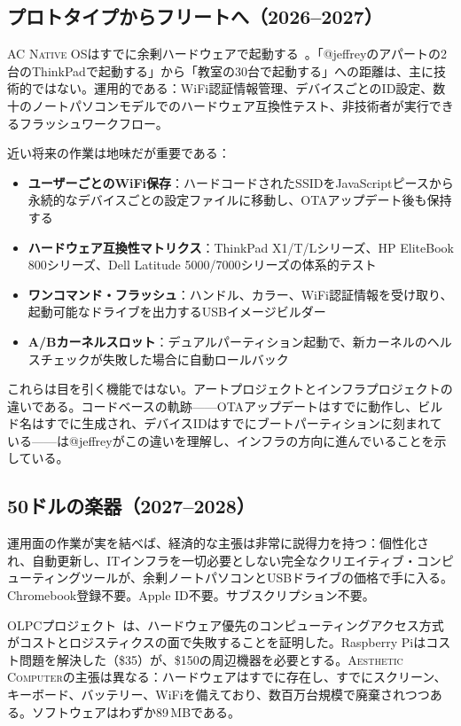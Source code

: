 \documentclass[10pt,letterpaper,twocolumn]{article}
\newcommand{\ac}{\textsc{Aesthetic Computer}}
\newcommand{\acos}{\textsc{AC Native OS}}
\begin{document}
\subsection{プロトタイプからフリートへ（2026--2027）}

\acos{}はすでに余剰ハードウェアで起動する~\citep{scudder2026os}。「@jeffreyのアパートの2台のThinkPadで起動する」から「教室の30台で起動する」への距離は、主に技術的ではない。運用的である：WiFi認証情報管理、デバイスごとのID設定、数十のノートパソコンモデルでのハードウェア互換性テスト、非技術者が実行できるフラッシュワークフロー。

近い将来の作業は地味だが重要である：

\begin{itemize}
  \item \textbf{ユーザーごとのWiFi保存}：ハードコードされたSSIDをJavaScriptピースから永続的なデバイスごとの設定ファイルに移動し、OTAアップデート後も保持する
  \item \textbf{ハードウェア互換性マトリクス}：ThinkPad X1/T/Lシリーズ、HP EliteBook 800シリーズ、Dell Latitude 5000/7000シリーズの体系的テスト
  \item \textbf{ワンコマンド・フラッシュ}：ハンドル、カラー、WiFi認証情報を受け取り、起動可能なドライブを出力するUSBイメージビルダー
  \item \textbf{A/Bカーネルスロット}：デュアルパーティション起動で、新カーネルのヘルスチェックが失敗した場合に自動ロールバック
\end{itemize}

これらは目を引く機能ではない。アートプロジェクトとインフラプロジェクトの違いである。コードベースの軌跡——OTAアップデートはすでに動作し、ビルド名はすでに生成され、デバイスIDはすでにブートパーティションに刻まれている——は@jeffreyがこの違いを理解し、インフラの方向に進んでいることを示している。

\subsection{50ドルの楽器（2027--2028）}

運用面の作業が実を結べば、経済的な主張は非常に説得力を持つ：個性化され、自動更新し、ITインフラを一切必要としない完全なクリエイティブ・コンピューティングツールが、余剰ノートパソコンとUSBドライブの価格で手に入る。Chromebook登録不要。Apple ID不要。サブスクリプション不要。

OLPCプロジェクト~\citep{kraemer2009olpc}は、ハードウェア優先のコンピューティングアクセス方式がコストとロジスティクスの面で失敗することを証明した。Raspberry Piはコスト問題を解決した（\$35）が、\$150の周辺機器を必要とする。\ac{}の主張は異なる：ハードウェアはすでに存在し、すでにスクリーン、キーボード、バッテリー、WiFiを備えており、数百万台規模で廃棄されつつある。ソフトウェアはわずか89\,MBである。
\end{document}

